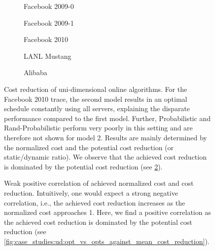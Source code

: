 \begin{figure}
    \begin{subfigure}[b]{.3425\linewidth}
    \resizebox{\textwidth}{!}{}
    \caption{Facebook 2009-0}
    \end{subfigure}
    \begin{subfigure}[b]{.32\linewidth}
    \resizebox{\textwidth}{!}{}
    \caption{Facebook 2009-1}
    \end{subfigure}
    \begin{subfigure}[b]{.32\linewidth}
    \resizebox{\textwidth}{!}{}
    \caption{Facebook 2010}
    \end{subfigure}
    \par\bigskip
    \begin{subfigure}[b]{.50\linewidth}
    \resizebox{\textwidth}{!}{}
    \caption{LANL Mustang}
    \end{subfigure}
    \begin{subfigure}[b]{.48\linewidth}
    \resizebox{\textwidth}{!}{}
    \caption{Alibaba}
    \end{subfigure}
    \caption{Cost reduction of uni-dimensional online algorithms. For the Facebook 2010 trace, the second model results in an optimal schedule constantly using all servers, explaining the disparate performance compared to the first model. Further, Probabilistic and Rand-Probabilistic perform very poorly in this setting and are therefore not shown for model 2. Results are mainly determined by the normalized cost and the potential cost reduction (or static/dynamic ratio). We observe that the achieved cost reduction is dominated by the potential cost reduction (see \cref{fig:case_studies:ud:cost_reduction_vs_normalized_cost}).}\label{fig:case_studies:ud:cost_reduction}
\end{figure}

\begin{figure}
    \centering
    
    \caption{Weak positive correlation of achieved normalized cost and cost reduction. Intuitively, one would expect a strong negative correlation, i.e., the achieved cost reduction increases as the normalized cost approaches 1. Here, we find a positive correlation as the achieved cost reduction is dominated by the potential cost reduction (see \cref{fig:case_studies:ud:opt_vs_opts_against_mean_cost_reduction}).}\label{fig:case_studies:ud:cost_reduction_vs_normalized_cost}
\end{figure}

